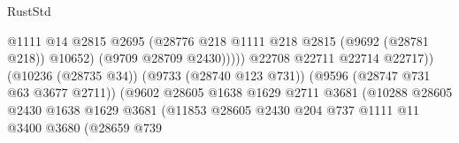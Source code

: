 \begin{lexlean}{RustStd}
\begin{coremodule}
{\begin{coremodule}
{{{{{{{{{{{{{{{{{{{{{{{{{{{{{{{{{{{{{{{{{{{{{{{{{{{{{{{                                                            @1111
                                                            @14
                                                            @2815
                                                            @2695
                                                            (@28776
                                                              @218
                                                              @1111
                                                              @218
                                                              @2815
                                                              (@9692 (@28781 @218))
                                                              @10652)
                                                            (@9709 @28709 @2430)))))
                                                    @22708
                                                    @22711
                                                    @22714
                                                    @22717))
                                                (@10236 (@28735 @34))
                                                (@9733 (@28740 @123 @731))
                                                (@9596 (@28747 @731 @63 @3677 @2711))
                                                (@9602
                                                  @28605
                                                  @1638
                                                  @1629
                                                  @2711
                                                  @3681
                                                  (@10288
                                                    @28605
                                                    @2430
                                                    @1638
                                                    @1629
                                                    @3681
                                                    (@11853
                                                      @28605
                                                      @2430
                                                      @204
                                                      @737
                                                      @1111
                                                      @11
                                                      @3400
                                                      @3680
                                                      (@28659
                                                        @739
}}}}}}}}}}}}}}}}}}}}}}}}}}}}}}}}}}}}}}}}}}}}}}}}}}}}}}}
\end{coremodule}}
\end{coremodule}
\end{lexlean}
